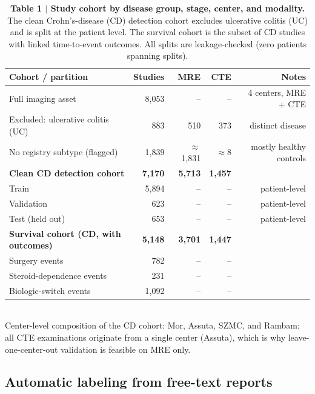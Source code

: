 \documentclass[11pt]{article}
\begin{document}
\begin{table}[htbp]
\centering
\caption{\textbf{Table 1 $\vert$ Study cohort by disease group, stage, center, and modality.}
The clean Crohn's-disease (CD) detection cohort excludes ulcerative colitis (UC) and is
split at the patient level. The survival cohort is the subset of CD studies with linked
time-to-event outcomes. All splits are leakage-checked (zero patients spanning splits).}
\label{tab:cohort}
\small
\begin{tabular}{@{}lrrrr@{}}
\toprule
\textbf{Cohort / partition} & \textbf{Studies} & \textbf{MRE} & \textbf{CTE} & \textbf{Notes} \\
\midrule
Full imaging asset             & 8{,}053 & --      & --      & 4 centers, MRE + CTE \\
\quad Excluded: ulcerative colitis (UC) & 883  & 510     & 373     & distinct disease \\
\quad No registry subtype (flagged)     & 1{,}839 & $\approx$1{,}831 & $\approx$8 & mostly healthy controls \\
\midrule
\textbf{Clean CD detection cohort} & \textbf{7{,}170} & \textbf{5{,}713} & \textbf{1{,}457} & \\
\quad Train                    & 5{,}894 & --      & --      & patient-level \\
\quad Validation               & 623     & --      & --      & patient-level \\
\quad Test (held out)          & 653     & --      & --      & patient-level \\
\midrule
\textbf{Survival cohort (CD, with outcomes)} & \textbf{5{,}148} & \textbf{3{,}701} & \textbf{1{,}447} & \\
\quad Surgery events           & 782     & --      & --      & \\
\quad Steroid-dependence events & 231    & --      & --      & \\
\quad Biologic-switch events   & 1{,}092 & --      & --      & \\
\bottomrule
\end{tabular}
\vspace{2pt}
\footnotesize
\\Center-level composition of the CD cohort: Mor, Assuta, SZMC, and Rambam; all CTE
examinations originate from a single center (Assuta), which is why leave-one-center-out
validation is feasible on MRE only.
\end{table}

\subsection*{Automatic labeling from free-text reports}
\end{document}
